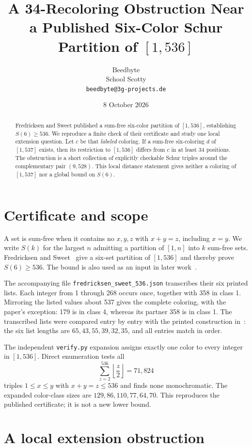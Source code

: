 \documentclass[11pt,a4paper]{article}
\title{A 34-Recoloring Obstruction Near a Published Six-Color Schur Partition of $[1,536]$}
\author{Beedbyte\\School Scotty\\\texttt{beedbyte@3g-projects.de}}
\date{8 October 2026}
\begin{document}
\maketitle

\begin{abstract}
Fredricksen and Sweet published a sum-free six-color partition of $[1,536]$, establishing $S(6)\geq536$. We reproduce a finite check of their certificate and study one local extension question. Let $c$ be that \emph{labeled} coloring. If a sum-free six-coloring $d$ of $[1,537]$ exists, then its restriction to $[1,536]$ differs from $c$ in at least 34 positions. The obstruction is a short collection of explicitly checkable Schur triples around the complementary pair $(9,528)$. This local distance statement gives neither a coloring of $[1,537]$ nor a global bound on $S(6)$.
\end{abstract}

\section{Certificate and scope}

A set is sum-free when it contains no $x,y,z$ with $x+y=z$, including $x=y$. We write $S(k)$ for the largest $n$ admitting a partition of $[1,n]$ into $k$ sum-free sets. Fredricksen and Sweet~\cite{FS2000} give a six-set partition of $[1,536]$ and thereby prove $S(6)\geq536$. The bound is also used as an input in later work~\cite{Bengone2026}.

The accompanying file \texttt{fredricksen\_sweet\_536.json} transcribes their six printed lists. Each integer from 1 through 268 occurs once, together with 358 in class 1. Mirroring the listed values about 537 gives the complete coloring, with the paper's exception: 179 is in class 4, whereas its partner 358 is in class 1. The transcribed lists were compared entry by entry with the printed construction in~\cite{FS2000}: the six list lengths are $65,43,55,39,32,35$, and all entries match in order.

The independent \texttt{verify.py} expansion assigns exactly one color to every integer in $[1,536]$. Direct enumeration tests all
\[
\sum_{z=2}^{536}\left\lfloor\frac z2\right\rfloor=71{,}824
\]
triples $1\leq x\leq y$ with $x+y=z\leq536$ and finds none monochromatic. The expanded color-class sizes are $129,86,110,77,64,70$. This reproduces the published certificate; it is not a new lower bound.

\section{A local extension obstruction}
\end{document}
